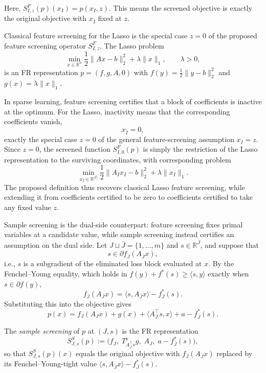 Here, \(S^F_{I,z}(p)(x_I)=p(x_I,z)\). This means  the screened objective is exactly the original objective with \(x_{\bar I}\) fixed at \(z\).

\begin{example}
\label{ex:lasso-feature}
Classical feature screening for the Lasso is the special case \(z=0\)
of the proposed feature screening operator \(S^F_{I,z}\). The Lasso
problem
\[
\min_{x\in\mathbb R^n}
\frac12\|Ax-b\|_2^2+\lambda\|x\|_1,
\qquad \lambda>0,
\]
is an FR representation \(p=(f,g,A,0)\) with
\(f(y)=\frac12\|y-b\|_2^2\) and \(g(x)=\lambda\|x\|_1\).

In sparse learning, feature screening certifies that a block of
coefficients is inactive at the optimum. For the Lasso, inactivity means
that the corresponding coefficients vanish,
\[
x_{\bar I}=0,
\]
exactly the special case \(z=0\) of the general feature-screening
assumption \(x_{\bar I}=z\). Since \(z=0\), the screened function
\(S^F_{I,0}(p)\) is simply the restriction of the Lasso representation
to the surviving coordinates, with corresponding problem
\[
\min_{x_I\in\mathbb R^{|I|}}
\frac12\|A_Ix_I-b\|_2^2+\lambda\|x_I\|_1.
\]
The proposed definition thus recovers classical Lasso feature
screening, while extending it from coefficients certified to be zero
to coefficients certified to take any fixed value \(z\).
\end{example}


Sample screening is the dual-side counterpart: feature screening fixes
primal variables at a candidate value, while sample screening instead
certifies an assumption on the dual side. Let
\(J\sqcup\bar J=\{1,\ldots,m\}\) and \(s\in\mathbb R^{\bar J}\), and
suppose that
\[
s\in\partial f_{\bar J}(A_{\bar J}x),
\]
i.e., \(s\) is a subgradient of the eliminated loss block evaluated at
\(x\). By the Fenchel--Young equality, which holds
in \(f(y)+f^*(s)\geq\langle s,y\rangle\) exactly when \(s\in\partial
f(y)\),
\[
f_{\bar J}(A_{\bar J}x)
=
\langle s,A_{\bar J}x\rangle-f_{\bar J}^{*}(s).
\]
Substituting this into the objective gives
\[
p(x)
=
f_J(A_Jx)+g(x)+\langle A_{\bar J}^{\top}s,x\rangle+a-f_{\bar J}^{*}(s).
\]

\begin{definition}
The \emph{sample screening} of \(p\) at \((J,s)\) is the FR
representation
\[
S^{S}_{J,s}(p)
:=
\bigl(
f_J,\;
T^{\mathrm s}_{A_{\bar J}^{\top}s}g,\;
A_J,\;
a-f_{\bar J}^{*}(s)
\bigr),
\]
so that \(S^S_{J,s}(p)(x)\) equals the original objective with
\(f_{\bar J}(A_{\bar J}x)\) replaced by its Fenchel--Young-tight value
\(\langle s,A_{\bar J}x\rangle-f_{\bar J}^{*}(s)\).
\end{definition}

